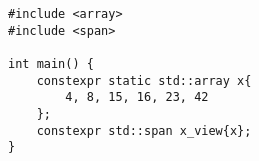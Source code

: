 \begin{lstlisting}[title=\href{https://godbolt.org/z/Ga5Ysv}{\texttt{godbolt.org/z/Ga5Ysv}}]
#include <array>
#include <span>

int main() {
    constexpr static std::array x{
        4, 8, 15, 16, 23, 42
    };
    constexpr std::span x_view{x};
}
\end{lstlisting}
